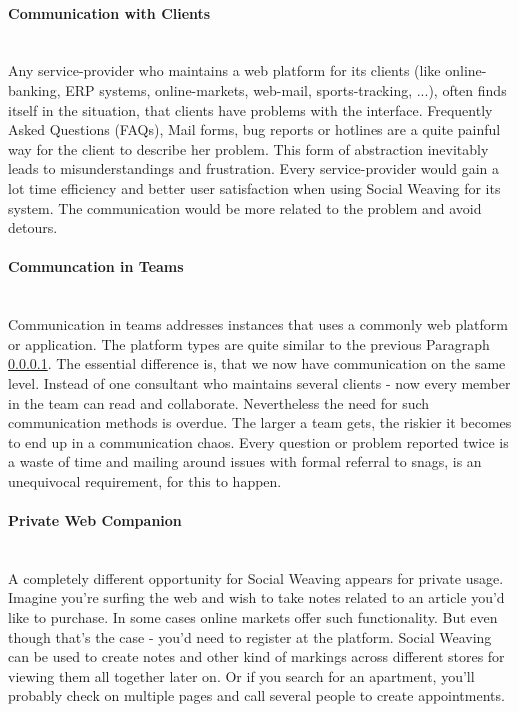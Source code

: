 \paragraph{Communication with Clients}\label{comm-clients}\mbox{}\\
Any service-provider who maintains a web platform for its clients (like online-banking, ERP systems, online-markets, web-mail, sports-tracking, ...), often finds itself in the situation, that clients have problems with the interface. Frequently Asked Questions (FAQs), Mail forms, bug reports or hotlines are a quite painful way for the client to describe her problem. This form of abstraction inevitably leads to misunderstandings and frustration. 
Every service-provider would gain a lot time efficiency and better user satisfaction when using Social Weaving for its system. The communication would be more related to the problem and avoid detours. 

\paragraph{Communcation in Teams}\mbox{}\\
Communication in teams addresses instances that uses a commonly web platform or application. The platform types are quite similar to the previous Paragraph \ref{comm-clients}. The essential difference is, that we now have communication on the same level. Instead of one consultant who maintains several clients - now every member in the team can read and collaborate. 
Nevertheless the need for such communication methods is overdue. The larger a team gets, the riskier it becomes to end up in a communication chaos. Every question or problem reported twice is a waste of time and mailing around issues with formal referral to snags, is an unequivocal requirement, for this to happen.

\paragraph{Private Web Companion}\mbox{}\\
A completely different opportunity for Social Weaving appears for private usage. Imagine you're surfing the web and wish to take notes related to an article you'd like to purchase. In some cases online markets offer such functionality. But even though that's the case - you'd need to register at the platform. Social Weaving can be used to create notes and other kind of markings across different stores for viewing them all together later on. 
Or if you search for an apartment, you'll probably check on multiple pages and call several people to create appointments. 
\newpage

